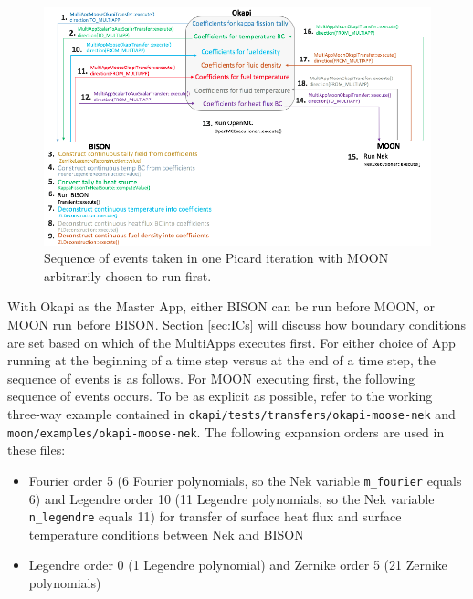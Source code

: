 \documentclass[10pt]{article}
\numberwithin{equation}{section} %
\begin{document}
\begin{figure}[H]
\centering
\includegraphics[width=17.5cm]{figures/OpenMC-BISON-Nek-complicated.png}
\caption{Sequence of events taken in one Picard iteration with MOON arbitrarily chosen to run first.}
\end{figure}

With Okapi as the Master App, either BISON can be run before MOON, or MOON run before BISON. Section \ref{sec:ICs} will discuss how boundary conditions are set based on which of the MultiApps executes first. For either choice of App running at the beginning of a time step versus at the end of a time step, the sequence of events is as follows. For MOON executing first, the following sequence of events occurs. To be as explicit as possible, refer to the working three-way example contained in {\tt okapi/tests/transfers/okapi-moose-nek} and {\tt moon/examples/okapi-moose-nek}. The following expansion orders are used in these files:

\begin{itemize}
\item Fourier order 5 (6 Fourier polynomials, so the Nek variable {\tt m\_fourier} equals 6) and Legendre order 10 (11 Legendre polynomials, so the Nek variable {\tt n\_legendre} equals 11) for transfer of surface heat flux and surface temperature conditions between Nek and BISON
\item Legendre order 0 (1 Legendre polynomial) and Zernike order 5 (21 Zernike polynomials)
\end{itemize}
\end{document}
